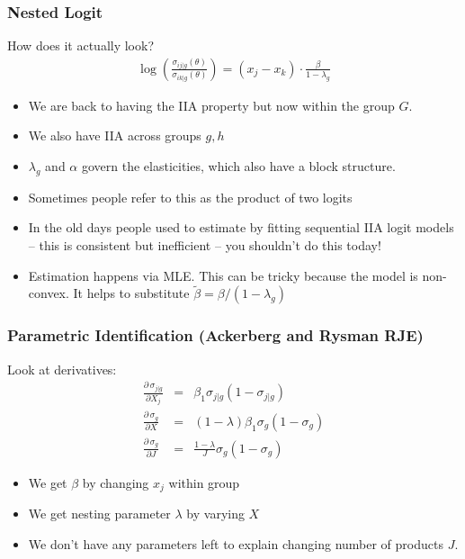\documentclass[aspectratio=169,11pt]{beamer}
\begin{document}
\begin{frame}
\frametitle{Nested Logit}
How does it actually look?
\begin{eqnarray*}
\log \left(\frac{\sigma_{ij|g}(\theta)}{\sigma_{ik|g}(\theta)} \right) = (x_j -x_k)\cdot \frac{\beta}{1-\lambda_g}
 \end{eqnarray*}
 \begin{itemize}
\item We are back to having the IIA property but now within the group $G$.
\item We also have IIA across groups $g,h$
\item $\lambda_g$ and $\alpha$ govern the elasticities, which also have a block structure. %
\item Sometimes people refer to this as the \alert{product of two logits}
\item In the old days people used to estimate by fitting sequential IIA logit models -- this is consistent but inefficient -- you shouldn't do this today!
\item Estimation happens via MLE. This can be tricky because the model is non-convex. It helps to substitute $\tilde{\beta} = \beta/(1-\lambda_g)$
 \end{itemize}
\end{frame}

\begin{frame}
\frametitle{Parametric Identification (Ackerberg and Rysman RJE)}

Look at derivatives:
\begin{eqnarray*}
\frac{\partial\, \sigma_{j|g}}{\partial X_j} &=& \beta_1 \sigma_{j|g}(1-\sigma_{j|g}) \\
 \frac{\partial\, \sigma_{g}}{\partial X} &=& (1-\lambda) \beta_1 \sigma_{g}(1-\sigma_{g}) \\
  \frac{\partial\, \sigma_{g}}{\partial J} &=& \frac{1-\lambda}{J} \sigma_{g}(1-\sigma_{g})
\end{eqnarray*}
\begin{itemize}
\item We get $\beta$ by changing $x_j$ within group
\item We get nesting parameter $\lambda$ by varying $X$
\item We don't have any parameters left to explain changing number of products $J$.
\end{itemize}

\end{frame}
\end{document}

